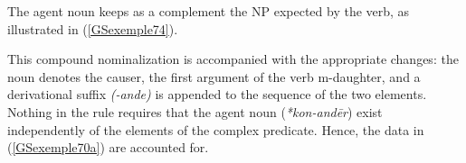 \documentclass[output=paper
                ,modfonts
                ,nonflat
	        ,collection
	        ,collectionchapter
	        ,collectiontoclongg
 	        ,biblatex
                ,babelshorthands
                ,newtxmath
                ,draftmode
                ,colorlinks, citecolor=brown
]{./langsci/langscibook}
\begin{document}
{\begin{exe}
\end{exe}

The agent noun keeps as a complement the NP expected by the verb, as illustrated in (\ref{GSexemple74}).   

\begin{exe}
	\label{GSexemple74}

\end{exe}

This compound nominalization is accompanied with the appropriate changes: the noun denotes the causer, the first argument of the verb m-daughter, and a derivational suffix \textit{(-ande)} is appended to the sequence of the two elements. Nothing in the rule requires that the agent noun (\textit{*kon-and\=er}) exist independently of the elements of the complex predicate. Hence, the data in (\ref{GSexemple70a}) are accounted for.

}
\end{document}
